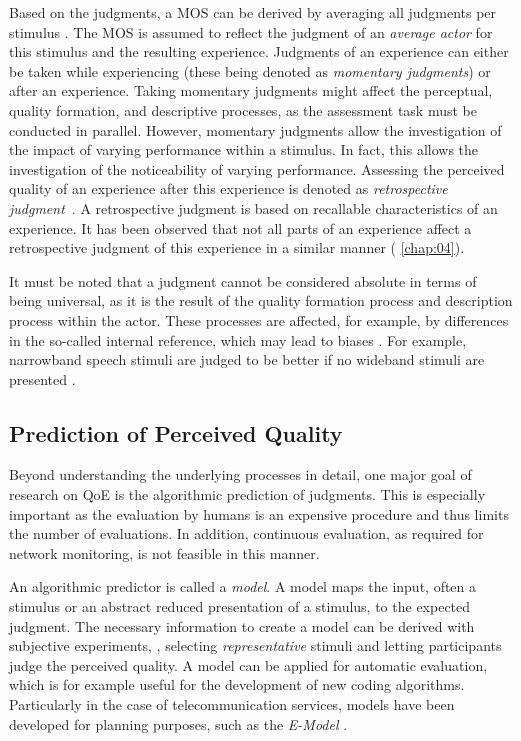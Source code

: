 Based on the judgments, a \acf{MOS} can be derived by averaging all judgments per stimulus \citep{itu-t_recommendation_p.800.2_mean_2013}.
The \ac{MOS} is assumed to reflect the judgment of an \emph{average actor} for this stimulus and the resulting experience.
Judgments of an experience can either be taken while experiencing (these being denoted as \emph{momentary judgments}) or after an experience.
Taking momentary judgments might affect the perceptual, quality formation, and descriptive processes, as the assessment task must be conducted in parallel. %
However, momentary judgments allow the investigation of the impact of varying performance within a stimulus.
In fact, this allows the investigation of the noticeability of varying performance.
Assessing the perceived quality of an experience after this experience is denoted as \emph{retrospective judgment}~\citep[][]{weiss_temporal_2014}.
A retrospective judgment is based on recallable characteristics of an experience.
It has been observed that not all parts of an experience affect a retrospective judgment of this experience in a similar manner (\cf{} \autoref{chap:04}).

It must be noted that a judgment cannot be considered absolute in terms of being universal, as it is the result of the quality formation process and description process within the actor.
These processes are affected, for example, by differences in the so-called internal reference, which may lead to biases \citep[][]{zielinski_biases_2008, pitrey_aligning_2011}.
For example, narrowband speech stimuli are judged to be better if no wideband stimuli are presented \citep[][]{koster_comparison_2015}.

\subsection{Prediction of Perceived Quality}
Beyond understanding the underlying processes in detail, one major goal of research on \ac{QoE} is the algorithmic prediction of judgments.
This is especially important as the evaluation by humans is an expensive procedure and thus limits the number of evaluations.
In addition, continuous evaluation, as required for network monitoring, is not feasible in this manner.

An algorithmic predictor is called a \emph{model}.
A model maps the input, often a stimulus or an abstract reduced presentation of a stimulus, to the expected judgment.
The necessary information to create a model can be derived with subjective experiments, \ie, selecting \emph{representative} stimuli and letting participants judge the perceived quality.
A model can be applied for automatic evaluation, which is for example useful for the development of new coding algorithms.
Particularly in the case of telecommunication services, models have been developed for planning purposes, such as the \emph{E-Model} \citep{itu-t_recommendation_g.107_e-model_2015}.

